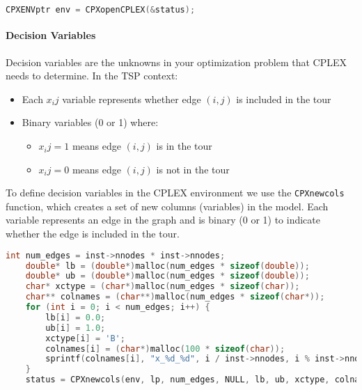 \documentclass{article}
\begin{document}
\begin{lstlisting}[language=C]
	CPXENVptr env = CPXopenCPLEX(&status);
\end{lstlisting}


\paragraph{Decision Variables}
Decision variables are the unknowns in your optimization problem that CPLEX needs to determine. In the TSP context: 
\begin{itemize}
	\item Each $x_ij$ variable represents whether edge $(i,j)$ is included in the tour
	\item Binary variables (0 or 1) where:
	\begin{itemize}
		\item $x_ij = 1$ means edge $(i,j)$ is in the tour
		\item $x_ij = 0$ means edge $(i,j)$ is not in the tour
	\end{itemize}
\end{itemize}

To define decision variables in the CPLEX environment we use the \texttt{CPXnewcols} function, which creates a set of new columns (variables) in the model.
Each variable represents an edge in the graph and is binary (0 or 1) to indicate whether the edge is included in the tour.
\begin{lstlisting}[language=C]
	int num_edges = inst->nnodes * inst->nnodes;
	double* lb = (double*)malloc(num_edges * sizeof(double));
	double* ub = (double*)malloc(num_edges * sizeof(double));
	char* xctype = (char*)malloc(num_edges * sizeof(char));
	char** colnames = (char**)malloc(num_edges * sizeof(char*));
	for (int i = 0; i < num_edges; i++) {
		lb[i] = 0.0;
		ub[i] = 1.0;
		xctype[i] = 'B';
		colnames[i] = (char*)malloc(100 * sizeof(char));
		sprintf(colnames[i], "x_%d_%d", i / inst->nnodes, i % inst->nnodes);
	}
	status = CPXnewcols(env, lp, num_edges, NULL, lb, ub, xctype, colnames);
\end{lstlisting}
\end{document}
